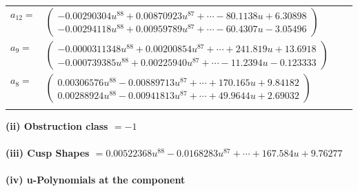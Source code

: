 \documentclass[1p]{elsarticle_modified}
\theoremstyle{definition}
\begin{document}
\begin{tabular}{m{7pt} m{180pt} m{7pt} m{180pt} }
\flushright $a_{12}=$&$\begin{pmatrix}-0.00290304 u^{88}+0.00870923 u^{87}+\cdots-80.1138 u+6.30898\\-0.00294118 u^{88}+0.00959789 u^{87}+\cdots-60.4307 u-3.05496\end{pmatrix}$ \\
\flushright $a_{9}=$&$\begin{pmatrix}-0.0000311348 u^{88}+0.00200854 u^{87}+\cdots+241.819 u+13.6918\\-0.000739385 u^{88}+0.00225940 u^{87}+\cdots-11.2394 u-0.123333\end{pmatrix}$ \\
\flushright $a_{8}=$&$\begin{pmatrix}0.00306576 u^{88}-0.00889713 u^{87}+\cdots+170.165 u+9.84182\\0.00288924 u^{88}-0.00941813 u^{87}+\cdots+49.9644 u+2.69032\end{pmatrix}$\\&\end{tabular}
\flushleft \textbf{(ii) Obstruction class $= -1$}\\~\\
\flushleft \textbf{(iii) Cusp Shapes $= 0.00522368 u^{88}-0.0168283 u^{87}+\cdots+167.584 u+9.76277$}\\~\\
\newpage\renewcommand{\arraystretch}{1}
\flushleft \textbf{(iv) u-Polynomials at the component}\newline \\
\end{document}

